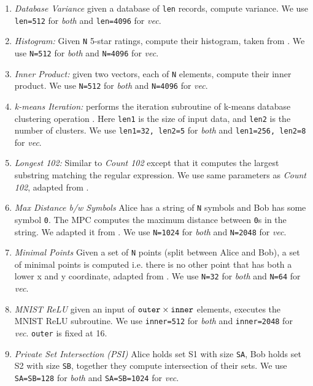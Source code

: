 \begin{enumerate}
    \item {\em Database Variance} given a database of {\tt len} records, compute variance. %
    We use {\tt len=512} for {\em both} and {\tt len=4096} for {\em vec}.
    
    \item {\em Histogram:} Given {\tt N} 5-star ratings, compute their histogram, taken from \cite{Ishaq:2019, Farzan:2021}. We use {\tt N=512} for {\em both} and {\tt N=4096} for {\em vec}.

    \item {\em Inner Product:} given two vectors, each of {\tt N} elements, compute their inner product. We use {\tt N=512} for {\em both} and {\tt N=4096} for {\em vec}.

    \item {\em k-means Iteration:} performs the iteration subroutine of k-means database clustering operation \cite{Jagannathan:2005, Vaidya:2003}. Here {\tt len1} is the size of input data, and {\tt len2} is the number of clusters. We use {\tt len1=32, len2=5} for {\em both} and {\tt len1=256, len2=8} for {\em vec}. %
    
    \item {\em Longest 102:} Similar to {\em Count 102} except that it computes the largest substring matching the regular expression. We use same parameters as {\em Count 102}, adapted from \cite{Farzan:2021}.
    
    \item {\em Max Distance b/w Symbols} Alice has a string of {\tt N} symbols and Bob has some symbol {\tt 0}. The MPC computes the maximum distance between {\tt 0}s in the string. We adapted it from \cite{Farzan:2021}. We use {\tt N=1024} for {\em both} and {\tt N=2048} for {\em vec}.
    
    \item {\em Minimal Points} Given a set of {\tt N} points (split between Alice and Bob), a set of minimal points is computed i.e. there is no other point that has both a lower x and y coordinate, adapted from \cite{Farzan:2021}. We use {\tt N=32} for {\em both} and {\tt N=64} for {\em vec}.
    
    \item {\em MNIST ReLU} given an input of ${\tt outer}\times{\tt inner}$ elements, executes the MNIST ReLU subroutine. We use {\tt inner=512} for {\em both} and {\tt inner=2048} for {\em vec}. {\tt outer} is fixed at 16. %
    
    \item {\em Private Set Intersection (PSI)} Alice holds set S1 with size {\tt SA}, Bob holds set S2 with size {\tt SB}, together they compute intersection of their sets. We use {\tt SA=SB=128} for {\em both} and {\tt SA=SB=1024} for {\em vec}.
\end{enumerate}

